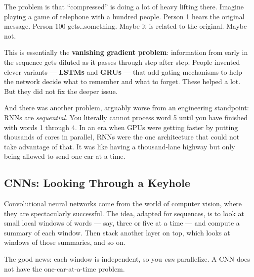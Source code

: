 The problem is that ``compressed'' is doing a lot of heavy lifting there.
Imagine playing a game of telephone with a hundred people.
Person 1 hears the original message.
Person 100 gets\ldots something.
Maybe it is related to the original.
Maybe not.

This is essentially the \textbf{vanishing gradient problem}: information from early in the sequence gets diluted as it passes through step after step.
People invented clever variants --- \textbf{LSTMs} and \textbf{GRUs} --- that add gating mechanisms to help the network decide what to remember and what to forget.
These helped a lot.
But they did not fix the deeper issue.

And there was another problem, arguably worse from an engineering standpoint: RNNs are \emph{sequential}.
You literally cannot process word 5 until you have finished with words 1 through 4.
In an era when GPUs were getting faster by putting thousands of cores in parallel, RNNs were the one architecture that could not take advantage of that.
It was like having a thousand-lane highway but only being allowed to send one car at a time.

\subsection{CNNs: Looking Through a Keyhole}

Convolutional neural networks come from the world of computer vision, where they are spectacularly successful.
The idea, adapted for sequences, is to look at small local windows of words --- say, three or five at a time --- and compute a summary of each window.
Then stack another layer on top, which looks at windows of those summaries, and so on.

The good news: each window is independent, so you \emph{can} parallelize.
A CNN does not have the one-car-at-a-time problem.

